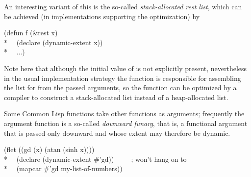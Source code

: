 \begin{newer}
\begin{flushdesc}
  An interesting variant of this is the so-called {\it stack-allocated rest list},
  which can be achieved (in implementations supporting the optimization) by
\begin{lisp}
(defun f (\&rest x) \\*
~~(declare (dynamic-extent x)) \\*
~~...)
\end{lisp}
  Note here that although the initial value of  is not explicitly present,
  nevertheless in the usual implementation strategy the
  function  is responsible for assembling the list for  from the passed arguments,
  so the  function can be optimized by a compiler to construct a 
  stack-allocated list instead of a heap-allocated list.

Some Common Lisp functions take other functions as arguments; frequently
the argument function is a so-called {\it downward funarg}, that is, a functional
argument that is passed only downward and whose extent may therefore be dynamic.
\begin{lisp}
(flet ((gd (x) (atan (sinh x)))) \\*
~~(declare (dynamic-extent \#'gd))~~~~~;{\rm {} won't hang on to }\\*
~~(mapcar \#'gd my-list-of-numbers))
\end{lisp}



\end{flushdesc}
\end{newer}
